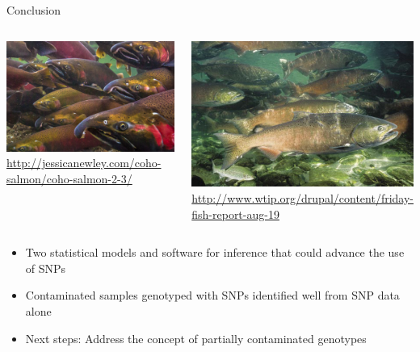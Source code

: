 \documentclass[letter,graphicx]{beamer}
\def\Tiny{\fontsize{3pt}{3pt} \selectfont}
\begin{document}
\begin{frame}{Conclusion}
\begin{columns}[c]
\column{2.5in}
\centering \includegraphics[width=.95\textwidth]{images/conclusion_salmon2.pdf}
\centering \Tiny \url{http://jessicanewley.com/coho-salmon/coho-salmon-2-3/}

\column{2.5in}
\centering \includegraphics[width=.95\textwidth]{images/conclusion_salmon.pdf} 
\centering \Tiny \url{http://www.wtip.org/drupal/content/friday-fish-report-aug-19}
\end{columns}

\begin{itemize}
   \item Two statistical models and software for inference that could advance the use of SNPs
   \vspace{3mm}
   \item Contaminated samples genotyped with SNPs identified well from SNP data alone
   \vspace{3mm}
   \item Next steps: Address the concept of partially contaminated genotypes
\end{itemize}
\end{frame}
\end{document}
